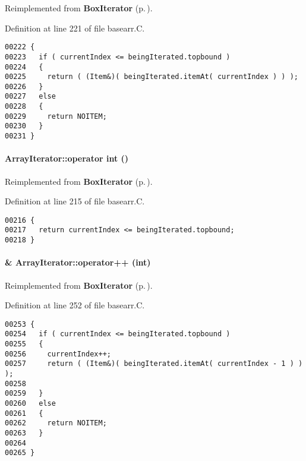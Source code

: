 Reimplemented from {\bf Box\-Iterator} {\rm (p.\,\pageref{BoxIterator_a3})}.

Definition at line 221 of file basearr.C.\small\begin{verbatim}00222 {
00223   if ( currentIndex <= beingIterated.topbound )
00224   {
00225     return ( (Item&)( beingIterated.itemAt( currentIndex ) ) );
00226   }
00227   else 
00228   {
00229     return NOITEM;
00230   }
00231 }
\end{verbatim}\normalsize 
\label{ArrayIterator_a2}
\paragraph{\setlength{\rightskip}{0pt plus 5cm}Array\-Iterator::operator int ()\hspace{0.3cm}{\tt  [virtual]}}\hfill



Reimplemented from {\bf Box\-Iterator} {\rm (p.\,\pageref{BoxIterator_a2})}.

Definition at line 215 of file basearr.C.\small\begin{verbatim}00216 {
00217   return currentIndex <= beingIterated.topbound;
00218 }
\end{verbatim}\normalsize 
\label{ArrayIterator_a5}
\paragraph{ \& Array\-Iterator::operator++ (int)\hspace{0.3cm}{\tt  [virtual]}}\hfill



Reimplemented from {\bf Box\-Iterator} {\rm (p.\,\pageref{BoxIterator_a5})}.

Definition at line 252 of file basearr.C.\small\begin{verbatim}00253 {
00254   if ( currentIndex <= beingIterated.topbound )
00255   {
00256     currentIndex++;
00257     return ( (Item&)( beingIterated.itemAt( currentIndex - 1 ) ) );
00258     
00259   }
00260   else 
00261   {
00262     return NOITEM;
00263   }
00264   
00265 }
\end{verbatim}\normalsize 
\label{ArrayIterator_a6}
